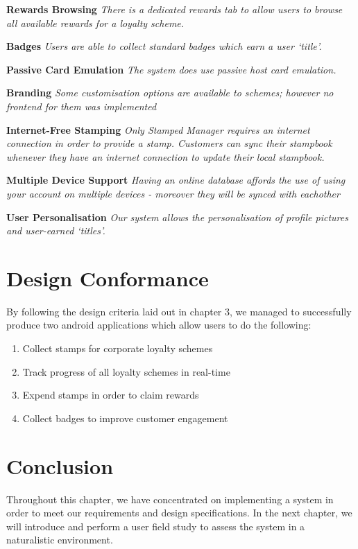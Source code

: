 \begin{description}[leftmargin=!,labelwidth=\widthof{\bfseries Medium}]
    \item[S2] \textbf{Rewards Browsing} \newline
        \textit{There is a dedicated rewards tab to allow users to browse all available rewards for a loyalty scheme.}

    \item[S3] \textbf{Badges} \newline
        \textit{Users are able to collect standard badges which earn a user `title'.}
     	
    \item[C1] \textbf{Passive Card Emulation} \newline
        \textit{The system does use passive host card emulation.}

    \item[C2] \textbf{Branding} \newline
        \textit{Some customisation options are available to schemes; however no frontend for them was implemented}

    \item[C3] \textbf{Internet-Free Stamping} \newline
        \textit{Only Stamped Manager requires an internet connection in order to provide a stamp. Customers can sync their stampbook whenever they have an internet connection to update their local stampbook.}
        
    \item[C4] \textbf{Multiple Device Support} \newline
        \textit{Having an online database affords the use of using your account on multiple devices - moreover they will be synced with eachother}
        
    \item[C5] \textbf{User Personalisation} \newline
        \textit{Our system allows the personalisation of profile pictures and user-earned `titles'.}
\end{description}

\newpage
\section{Design Conformance}
By following the design criteria laid out in chapter 3, we managed to successfully produce two android applications which allow users to do the following:

\begin{enumerate}
	\item Collect stamps for corporate loyalty schemes
	\item Track progress of all loyalty schemes in real-time
	\item Expend stamps in order to claim rewards
	\item Collect badges to improve customer engagement
\end{enumerate} 

\section{Conclusion}
Throughout this chapter, we have concentrated on implementing a system in order to meet our requirements and design specifications. In the next chapter, we will introduce and perform a user field study to assess the system in a naturalistic environment.